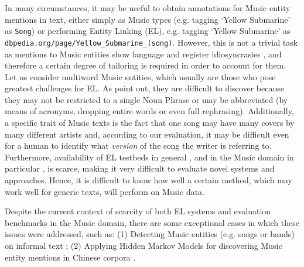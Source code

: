 In many circumstances, it may be useful to obtain annotations for Music entity mentions in text, either simply as Music types (e.g. tagging `Yellow Submarine' as \texttt{Song}) or performing Entity Linking (EL), e.g. tagging `Yellow Submarine' as \texttt{dbpedia.org/page/Yellow\_Submarine\_(song)}. However, this is not a trivial task as mentions to Music entities show language and register idiosyncrasies \cite{TataandDiEugenio2010,Gruhl2009}, and therefore a certain degree of tailoring is required in order to account for them. Let us consider multiword Music entities, which usually are those who pose greatest challenges for EL. As \cite{TataandDiEugenio2010} point out, they are difficult to discover because they may not be restricted to a single Noun Phrase or may be abbreviated (by means of acronyms, dropping entire words or even full rephrasing). Additionally, a specific trait of Music texts is the fact that one song may have many covers by many different artists and, according to our evaluation, it may be difficult even for a human to identify what \textit{version} of the song the writer is referring to. Furthermore, availability of EL testbeds in general \cite{Usbeck2015}, and in the Music domain in particular \cite{Gruhl2009}, is scarce, making it very difficult to evaluate novel systems and approaches. Hence, it is difficult to know how well a certain method, which may work well for generic texts, will perform on Music data.


Despite the current context of scarcity of both EL systems and evaluation benchmarks in the Music domain, there are some exceptional cases in which these issues were addressed, such as: (1) Detecting Music entities (e.g. songs or bands) on informal text \cite{Gruhl2009}; (2) Applying Hidden Markov Models for discovering Music entity mentions in Chinese corpora \cite{Zhang2009}.%

